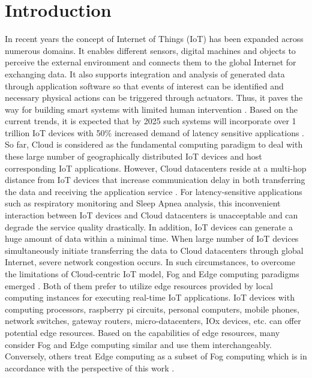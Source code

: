 \documentclass[final,5p,times,twocolumn]{elsarticle}
\begin{document}

\section{Introduction}
In recent years the concept of Internet of Things (IoT) has been expanded across numerous domains. It enables different sensors, digital machines and objects to perceive the external environment and connects them to the global Internet for exchanging data. It also supports integration and analysis of generated data through application software so that events of interest can be identified and necessary physical actions can be triggered through actuators. Thus, it paves the way for building smart systems with limited human intervention \cite{IoT}. Based on the current trends, it is expected that by 2025 such systems will incorporate over 1 trillion IoT devices with 50\% increased demand of latency sensitive applications \cite{mcKinsey}. So far, Cloud is considered as the fundamental computing paradigm to deal with these large number of geographically distributed IoT devices and host corresponding IoT applications. However, Cloud datacenters reside at a multi-hop distance from IoT devices that increase communication delay in both transferring the data and receiving the application service \cite{speed}. For latency-sensitive applications such as respiratory monitoring and Sleep Apnea analysis, this inconvenient interaction between IoT devices and Cloud datacenters is unacceptable and can degrade the service quality drastically. In addition, IoT devices can generate a huge amount of data within a minimal time. When large number of IoT devices simultaneously initiate transferring the data to Cloud datacenters through global Internet, severe network congestion occurs. In such circumstances, to overcome the limitations of Cloud-centric IoT model, Fog and Edge computing paradigms emerged \cite{FogInit}. Both of them prefer to utilize edge resources provided by local computing instances for executing real-time IoT applications. IoT devices with computing processors, raspberry pi circuits, personal computers, mobile phones, network switches, gateway routers, micro-datacenters, IOx devices, etc. can offer potential edge resources. Based on the capabilities of edge resources, many consider Fog and Edge computing similar and use them interchangeably. Conversely, others treat Edge computing as a subset of Fog computing which is in accordance with the perspective of this work \cite{me}.                 
%
\end{document}
